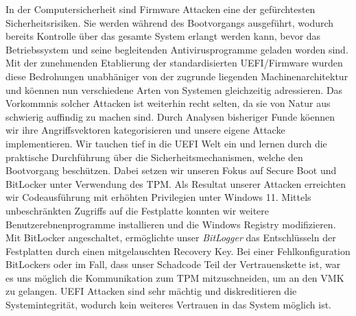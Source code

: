 In der Computersicherheit sind Firmware Attacken eine der gef\"urchtesten Sicherheitsrisiken.
Sie werden w\"ahrend des Bootvorgangs ausgef\"uhrt, wodurch bereits Kontrolle \"uber das gesamte System erlangt werden kann, bevor das Betriebssystem und seine begleitenden Antivirusprogramme geladen worden sind.
Mit der zunehmenden Etablierung der standardisierten \acs{UEFI}\-/Firmware wurden diese Bedrohungen unabh\"aniger von der zugrunde liegenden Machinenarchitektur und k\"oennen nun verschiedene Arten von Systemen gleichzeitig adressieren.
Das Vorkommnis solcher Attacken ist weiterhin recht selten, da sie von Natur aus schwierig auffindig zu machen sind.
Durch Analysen bisheriger Funde k\"oennen wir ihre Angriffsvektoren kategorisieren und unsere eigene Attacke implementieren.
Wir tauchen tief in die \acs{UEFI} Welt ein und lernen durch die praktische Durchf\"uhrung \"uber die Sicherheitsmechanismen, welche den Bootvorgang besch\"utzen.
Dabei setzen wir unseren Fokus auf Secure Boot und BitLocker unter Verwendung des \acs{TPM}.
Als Resultat unserer Attacken erreichten wir Codeausf\"uhrung mit erh\"ohten Privilegien unter Windows 11.
Mittels unbeschr\"ankten Zugriffs auf die Festplatte konnten wir weitere Benutzerebnenprogramme installieren und die Windows Registry modifizieren.
Mit BitLocker angeschaltet, erm\"oglichte unser \emph{BitLogger} das Entschl\"usseln der Festplatten durch einen mitgelauschten Recovery Key.
Bei einer Fehlkonfiguration BitLockers oder im Fall, dass unser Schadcode Teil der Vertrauenskette ist, war es uns m\"oglich die Kommunikation zum \acs{TPM} mitzuschneiden, um an den \acs{VMK} zu gelangen.
\acs{UEFI} Attacken sind sehr m\"achtig und diskreditieren die Systemintegrit\"at, wodurch kein weiteres Vertrauen in das System m\"oglich ist.

\acresetall